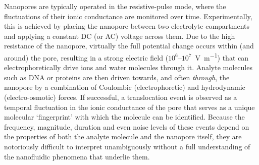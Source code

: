 \documentclass[twoside,twocolumn,9pt]{article}
\begin{document}
Nanopores are typically operated in the resistive-pulse mode, where the fluctuations of their ionic
conductance are monitored over time.\cite{Bayley-2001,Dekker-2007,Maglia-2010,Venkatesan-2011} Experimentally,
this is achieved by placing the nanopore between two electrolyte compartments and applying a constant DC (or
AC) voltage across them. Due to the high resistance of the nanopore, virtually the full potential change
occurs within (and around) the pore, resulting in a strong electric field ($10^6$--$10^7$~\si{\V\per\m})
that can electrophoretically drive ions and water molecules through
it.\cite{Wong-2007,Mao-2014,Haywood-2014,Laohakunakorn-2015} Analyte molecules such as DNA or proteins are
then driven towards, and often \emph{through}, the nanopore by a combination of Coulombic (electrophoretic)
and hydrodynamic (electro-osmotic) forces.\cite{Wong-2007,Grosberg-2010,Muthukumar-2010, Muthukumar-2014} If
successful, a translocation event is observed as a temporal fluctuation in the ionic conductance of the pore
that serves as a unique molecular `fingerprint' with which the molecule can be identified.\cite{Yusko-2017}
Because the frequency, magnitude, duration and even noise levels\cite{Yusko-2017,Houghtaling-2019} of these
events depend on the properties of both the analyte molecule and the nanopore itself, they are notoriously
difficult to interpret unambiguously without a full understanding of the nanofluidic phenomena that underlie
them.
\end{document}

